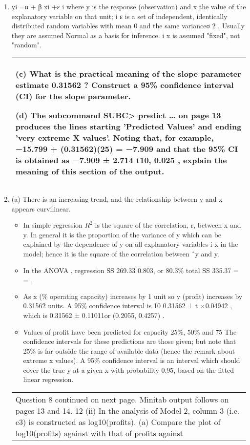 \documentclass[a4paper,12pt]{article}
\begin{document}
\begin{enumerate}
\item  yi =α + β xi +ε i
where y is the response (observation) and x the value of the explanatory variable on
that unit; { } i
ε is a set of independent, identically distributed random variables with
mean 0 and the same varianceσ 2 . Usually they are assumed Normal as a basis for
inference. i x is assumed "fixed", not "random".
\newpage
\begin{table}[ht!]
     \centering
     \begin{tabular}{|p{15cm}|}
     \hline        
\noindent
(c) What is the practical meaning of the slope parameter estimate
0.31562 ? Construct a 95\% confidence interval (CI) for the slope
parameter.

(d) The subcommand SUBC> predict … on page 13 produces the
lines starting 'Predicted Values' and ending 'very extreme X values'.
Noting that, for example, −15.799 + (0.31562)(25) = −7.909 and
that the 95\% CI is obtained as −7.909 ± 2.714 t10, 0.025 , explain the
meaning of this section of the output.

\\ \hline
      \end{tabular}
    \end{table}

\item  (a) There is an increasing trend, and the relationship between y and x
appears curvilinear.
\begin{itemize}
\item In simple regression $R^2$ is the square of the correlation, r, between x
and y. In general it is the proportion of the variance of y which can be
explained by the dependence of y on all explanatory variables { } i x in the
model; hence it is the square of the correlation between ˆy and y.
\item In the ANOVA , regression SS 269.33 0.803, or 80.3\%
total SS 335.37
= = .
\item As x (\% operating capacity) increases by 1 unit so y (profit) increases
by 0.31562 units.
A 95\% confidence interval is 10 0.31562 ± t ×0.04942 , which is
0.31562 ± 0.11011or (0.2055, 0.4257) .
\item Values of profit have been predicted for capacity 25\%, 50\% and 75%
The confidence intervals for these predictions are those given; but note that
25\% is far outside the range of available data (hence the remark about extreme
x values). A 95\% confidence interval is an interval which should cover the
true y at a given x with probability 0.95, based on the fitted linear regression.
\end{itemize}
\begin{table}[ht!]
     \centering
     \begin{tabular}{|p{15cm}|}
     \hline        
\noindent Question 8 continued on next page.
Minitab output follows on pages 13 and 14.
12
(ii) In the analysis of Model 2, column 3 (i.e. c3) is constructed as
log10(profits).
(a) Compare the plot of log10(profits) against %
with that of profits against %


\end{tabular}
\end{table}
\end{enumerate}
\end{document}
